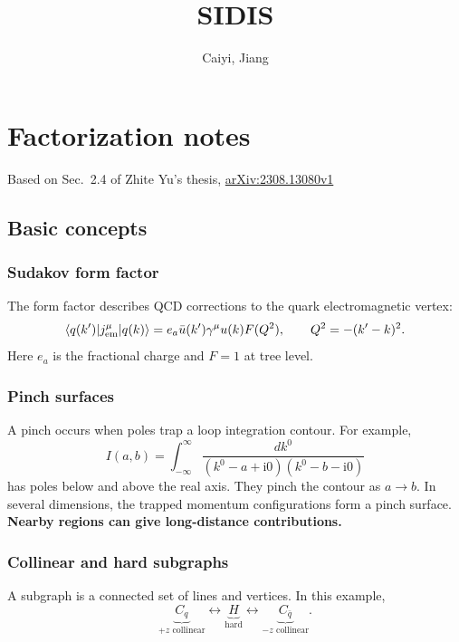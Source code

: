 \documentclass[14pt,a4paper]{extarticle}
\title{SIDIS}
\author{Caiyi, Jiang}
\date{}
\numberwithin{equation}{section}
\newcommand{\ii}{\mathrm i}
\begin{document}
\maketitle
\setcounter{tocdepth}{2}
\tableofcontents
\clearpage

\section{Factorization notes}
\label{sec:factorization-notes}
Based on Sec.~2.4 of Zhite Yu's thesis,
\href{https://arxiv.org/abs/2308.13080}{arXiv:2308.13080v1}
\subsection{Basic concepts}
\label{sec:factorization-foundations}
\subsubsection{Sudakov form factor}
The form factor describes QCD corrections to the quark electromagnetic vertex:
\begin{equation}
 \langle q(k')|j_{\rm em}^\mu|q(k)\rangle
 =e_a\bar u(k')\gamma^\mu u(k)F(Q^2),\qquad Q^2=-(k'-k)^2.
\end{equation}
Here $e_a$ is the fractional charge and $F=1$ at tree level.

\subsubsection{Pinch surfaces}
A pinch occurs when poles trap a loop integration contour. For example,
\begin{equation}
 I(a,b)=\int_{-\infty}^{\infty}
 \frac{dk^0}{(k^0-a+\ii0)(k^0-b-\ii0)}
\end{equation}
has poles below and above the real axis. They pinch the contour as $a\to b$.
In several dimensions, the trapped momentum configurations form a pinch
surface. \textbf{Nearby regions can give long-distance contributions.}
\subsubsection{Collinear and hard subgraphs}
A subgraph is a connected set of lines and vertices. In this example,
\begin{equation}
 \underbrace{C_q}_{+z\text{ collinear}}\longleftrightarrow
 \underbrace{H}_{\text{hard}}\longleftrightarrow
 \underbrace{C_{\bar q}}_{-z\text{ collinear}}.
\end{equation}
\end{document}
